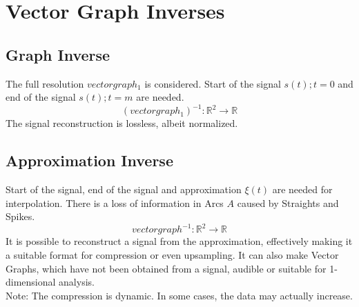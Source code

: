 \documentclass{report}
\begin{document}
\chapter{Vector Graph Inverses}
\section{Graph Inverse}
The full resolution $vectorgraph_{1}$ is considered. Start of the signal $s(t);t=0$ and end of the signal $s(t);t=m$ are needed.
\begin{equation}
(vectorgraph_{1})^{-1}: \mathbb{R}^2 \rightarrow \mathbb{R}
\end{equation}
The signal reconstruction is lossless, albeit normalized.
\section{Approximation Inverse}
Start of the signal, end of the signal and approximation $\xi(t)$ are needed for interpolation. There is a loss of information in Arcs $A$ caused by Straights and Spikes.
\begin{equation}
vectorgraph^{-1}: \mathbb{R}^2 \rightarrow \mathbb{R}
\end{equation}
It is possible to reconstruct a signal from the approximation, effectively making it a suitable format for compression or even upsampling. It can also make Vector Graphs, which have not been obtained from a signal, audible or suitable for 1-dimensional analysis.\\
Note: The compression is dynamic. In some cases, the data may actually increase.
\end{document}
